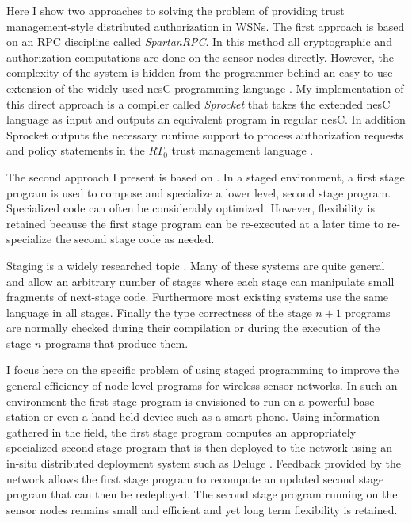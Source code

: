Here I show two approaches to solving the problem of providing trust management-style
distributed authorization in WSNs. The first approach is based on an RPC discipline called
\textit{SpartanRPC}. In this method all cryptographic and authorization computations are done on
the sensor nodes directly. However, the complexity of the system is hidden from the programmer
behind an easy to use extension of the widely used nesC programming language
\cite{Gay-nesC-2003}. My implementation of this direct approach is a compiler called
\textit{Sprocket} that takes the extended nesC language as input and outputs an equivalent
program in regular nesC. In addition Sprocket outputs the necessary runtime support to process
authorization requests and policy statements in the $RT_0$ trust management language
\cite{Li:DRBTMF,Li:RRBTMF}.

The second approach I present is based on . In a staged environment,
a first stage program is used to compose and specialize a lower level, second stage program.
Specialized code can often be considerably optimized. However, flexibility is retained because
the first stage program can be re-executed at a later time to re-specialize the second stage
code as needed.

Staging is a widely researched topic
\cite{Taha-MetaML,Sheard-TemplateHaskell,Mainland-Flask-2008,FramedML}.  Many of these systems are quite general and allow an
arbitrary number of stages where each stage can manipulate small fragments of next-stage code.
Furthermore most existing systems  use the same language in all stages.
Finally the type correctness of the stage $n+1$ programs are normally checked during their
compilation or during the execution of the stage $n$ programs that produce them.

I focus here on the specific problem of using staged programming to improve the general
efficiency of node level programs for wireless sensor networks. In such an environment the first
stage program is envisioned to run on a powerful base station or even a hand-held device such as
a smart phone. Using information gathered in the field, the first stage program computes an
appropriately specialized second stage program that is then deployed to the network using an
in-situ distributed deployment system such as Deluge \cite{deluge04}. Feedback provided by the
network allows the first stage program to recompute an updated second stage program that can
then be redeployed. The second stage program running on the sensor nodes remains small and
efficient and yet long term flexibility is retained.

